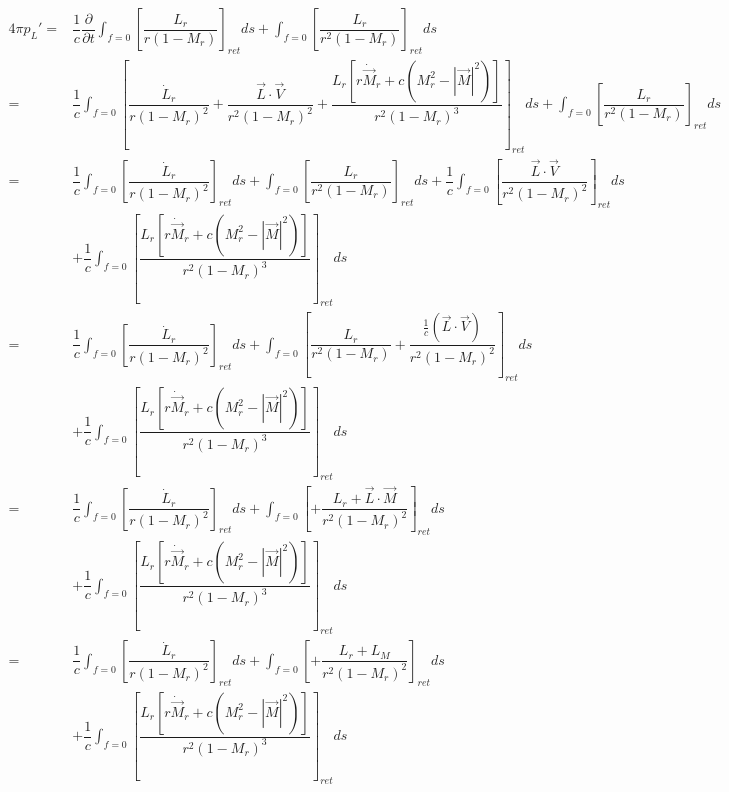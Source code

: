 \documentclass[onecolumn,10pt]{jhwhw}
\begin{document}
\begin{align*}
4\pi p_{L}' =& \dfrac{1}{c} \dfrac{\partial}{\partial t}
      \int_{f=0} \left[ \dfrac{L_r}{r   (1 - M_r)} \right]_{ret} ds
    + \int_{f=0} \left[ \dfrac{L_r}{r^2 (1 - M_r)} \right]_{ret} ds \\
=& \dfrac{1}{c} \int_{f=0} \left[
    \dfrac{\dot{L}_r}{r (1 - M_r)^2}
    + \dfrac{\vec{L}\cdot\vec{V}}{r^2 (1 - M_r)^2}
    + \dfrac{ L_r \left[
        r\dot{\vec{M}}_r + c \left( M_r^2 - |\vec{M}|^2 \right) \right] }
        {r^2 (1 - M_r)^3}
    \right]_{ret} ds
    + \int_{f=0} \left[ \dfrac{L_r}{r^2 (1 - M_r)} \right]_{ret} ds \\
=& \dfrac{1}{c} \int_{f=0} \left[
        \dfrac{\dot{L}_r}{r (1 - M_r)^2} \right]_{ret} ds + \int_{f=0} \left[ \dfrac{L_r}{r^2 (1 - M_r)} \right]_{ret} ds
    + \dfrac{1}{c} \int_{f=0} \left[
        \dfrac{\vec{L}\cdot\vec{V}}{r^2 (1 - M_r)^2} \right]_{ret} ds \\
    &+ \dfrac{1}{c} \int_{f=0} \left[
        \dfrac{ L_r \left[
        r\dot{\vec{M}}_r + c \left( M_r^2 - |\vec{M}|^2 \right) \right] }
        {r^2 (1 - M_r)^3} \right]_{ret} ds \\
=& \dfrac{1}{c} \int_{f=0} \left[
        \dfrac{\dot{L}_r}{r (1 - M_r)^2} \right]_{ret} ds
    + \int_{f=0} \left[ \dfrac{L_r}{r^2 (1 - M_r)}
        + \dfrac{\frac{1}{c} (\vec{L}\cdot\vec{V})}{r^2 (1 - M_r)^2}
        \right]_{ret} ds \\
    &+ \dfrac{1}{c} \int_{f=0} \left[
        \dfrac{ L_r \left[
        r\dot{\vec{M}}_r + c \left( M_r^2 - |\vec{M}|^2 \right) \right] }
        {r^2 (1 - M_r)^3} \right]_{ret} ds \\
=& \dfrac{1}{c} \int_{f=0} \left[
        \dfrac{\dot{L}_r}{r (1 - M_r)^2} \right]_{ret} ds
    + \int_{f=0} \left[
        + \dfrac{L_r + \vec{L}\cdot\vec{M}}{r^2 (1 - M_r)^2}
        \right]_{ret} ds \\
    &+ \dfrac{1}{c} \int_{f=0} \left[
        \dfrac{ L_r \left[
        r\dot{\vec{M}}_r + c \left( M_r^2 - |\vec{M}|^2 \right) \right] }
        {r^2 (1 - M_r)^3} \right]_{ret} ds \\
=& \dfrac{1}{c} \int_{f=0} \left[
        \dfrac{\dot{L}_r}{r (1 - M_r)^2} \right]_{ret} ds
    + \int_{f=0} \left[
        + \dfrac{L_r + L_M}{r^2 (1 - M_r)^2}
        \right]_{ret} ds \\
    &+ \dfrac{1}{c} \int_{f=0} \left[
        \dfrac{ L_r \left[
        r\dot{\vec{M}}_r + c \left( M_r^2 - |\vec{M}|^2 \right) \right] }
        {r^2 (1 - M_r)^3} \right]_{ret} ds
\end{align*}
\end{document}
